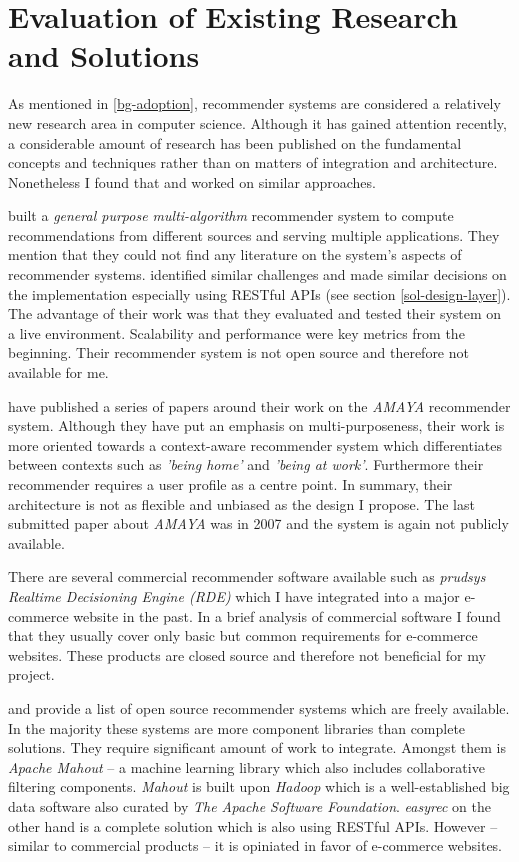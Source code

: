 \section{Evaluation of Existing Research and Solutions}
\label{prob-evaluation}

As mentioned in \ref{bg-adoption}, recommender systems are considered a relatively new research area in computer science. Although it has gained attention recently, a considerable amount of research has been published on the fundamental concepts and techniques rather than on matters of integration and architecture. Nonetheless I found that \citet{cortizo10} and \citet{rack07} worked on similar approaches.

\citet{cortizo10} built a \textit{general purpose multi-algorithm} recommender system to compute recommendations from different sources and serving multiple applications. They mention that they could not find any literature on the system's aspects of recommender systems. \citet{cortizo10} identified similar challenges and made similar decisions on the implementation especially using RESTful APIs (see section \ref{sol-design-layer}). The advantage of their work was that they evaluated and tested their system on a live environment. Scalability and performance were key metrics from the beginning. Their recommender system is not open source and therefore not available for me.

\citet{rack07} have published a series of papers around their work on the \emph{AMAYA} recommender system. Although they have put an emphasis on multi-purposeness, their work is more oriented towards a context-aware recommender system which differentiates between contexts such as \emph{'being home'} and \emph{'being at work'}. Furthermore their recommender requires a user profile as a centre point. In summary, their architecture is not as flexible and unbiased as the design I propose. The last submitted paper about \emph{AMAYA} was in 2007 and the system is again not publicly available.

There are several commercial recommender software available such as \emph{prudsys Realtime Decisioning Engine (RDE)} which I have integrated into a major e-commerce website in the past. In a brief analysis of commercial software I found that they usually cover only basic but common requirements for e-commerce websites. These products are closed source and therefore not beneficial for my project. 

\citet{hahsler11} and \citet{rack07} provide a list of open source recommender systems which are freely available. In the majority these systems are more component libraries than complete solutions. They require significant amount of work to integrate. Amongst them is \emph{Apache Mahout} -- a machine learning library which also includes collaborative filtering components. \emph{Mahout} is built upon \emph{Hadoop} which is a well-established big data software also curated by \emph{The Apache Software Foundation}. \emph{easyrec} on the other hand is a complete solution which is also using RESTful APIs. However -- similar to commercial products -- it is opiniated in favor of e-commerce websites.